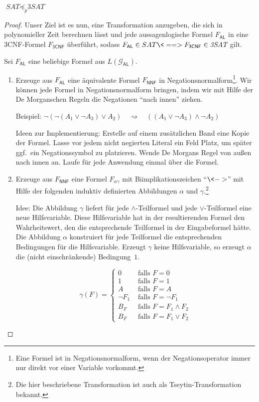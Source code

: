 \begin{lemma}\label{lem:sat3sat}
	$\textit{SAT} \preceq_p \textit{3SAT}$
\end{lemma}


\begin{proof}
Unser Ziel ist es nun, eine Transformation anzugeben, die sich in polynomieller Zeit berechnen lässt und jede aussagenlogische Formel $F_\mathsf{AL}$ in eine 3CNF-Formel $F_\mathsf{3CNF}$ überführt, sodass
$F_\mathsf{AL}\in SAT \<==> F_\mathsf{3CNF}\in \textit{3SAT}$
gilt.

Sei $F_\mathsf{AL}$ eine beliebige Formel aus $L(\mathcal{G}_\mathsf{AL})$.

\begin{enumerate}
 \item Erzeuge aus $F_\mathsf{AL}$ eine äquivalente Formel $F_\mathsf{NNF}$ in Negationsnormalform\footnote{Eine Formel ist in Negationsnormalform, wenn der Negationsoperator immer nur direkt vor einer Variable vorkommt.}.
 Wir können jede Formel in Negationsnormalform bringen, indem wir mit Hilfe der De Morganschen Regeln die Negationen "`nach innen"' ziehen.
 
 Beispiel: $\neg(\neg (A_1\lor \neg A_3)\lor A_2) \quad\rightsquigarrow\quad ((A_1\lor \neg A_3)\land \neg A_2)$
 
 Ideen zur Implementierung: Erstelle auf einem zusätzlichen Band eine Kopie der Formel.
 Lasse vor jedem nicht negierten Literal ein Feld Platz, um später ggf.\ ein Negationssymbol zu platzieren.
 Wende De Morgans Regel von außen nach innen an.
 Laufe für jede Anwendung einmal über die Formel.
 
 
 \item Erzeuge aus $F_\mathsf{NNF}$ eine Formel $F_{\alpha\gamma}$ mit Biimplikationszeichen "`$\<->$"' mit Hilfe der folgenden induktiv definierten Abbildungen $\alpha$ und $\gamma$.\footnote{%
 Die hier beschriebene Transformation ist auch als Tseytin-Transformation bekannt.}
 
 Idee: Die Abbildung $\gamma$ liefert für jede $\land$-Teilformel und jede $\lor$-Teilformel eine neue Hilfsvariable.
 Diese Hilfsvariable hat in der resultierenden Formel den Wahrheitswert, den die entsprechende Teilformel in der Eingabeformel hätte.
 Die Abbildung $\alpha$ konstruiert für jede Teilformel die entsprechenden Bedingungen für die Hilfsvariable.
 Erzeugt $\gamma$ keine Hilfsvariable, so erzeugt $\alpha$ die (nicht einschränkende) Bedingung~$1$.
 
 $$\gamma(F)=
 \begin{cases}
   0 & \text{ falls } F=0\\
   1 & \text{ falls } F=1\\
   A & \text{ falls } F=A\\
   \neg F_1 & \text{ falls } F=\neg F_1\\
   B_F & \text{ falls } F=F_1\land F_2\\
   B_F & \text{ falls } F=F_1\lor F_2
  \end{cases}$$
 

\end{enumerate}
\end{proof}
